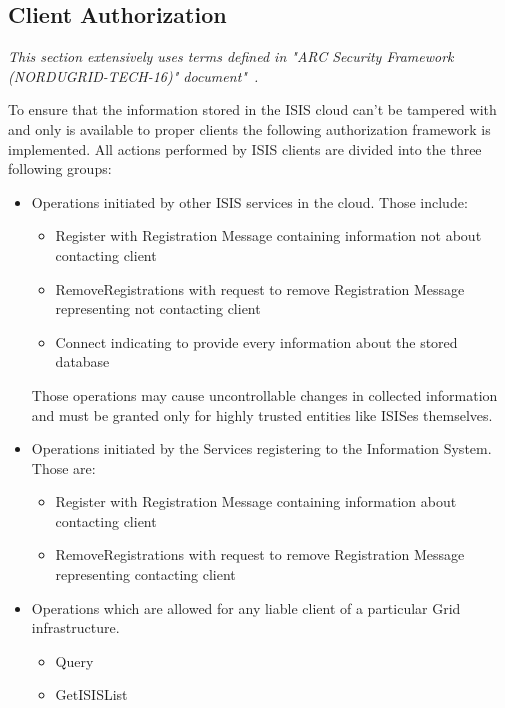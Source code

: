 \documentclass{book}
\begin{document}
\subsection{Client Authorization}
\label{sub:isis_authorization_client_authorization}


\textit{This section extensively uses terms defined in "ARC Security Framework (NORDUGRID-TECH-16)" document"~\cite{arc1-security}.}

To ensure that the information stored in the ISIS cloud can't be tampered with and only is available to proper clients the following authorization framework is implemented. All actions performed by ISIS clients are divided into the three following groups:

\begin{itemize}
 \item Operations initiated by other ISIS services in the cloud. Those include:
 \begin{itemize}
  \item Register with Registration Message containing information not about contacting client
  \item RemoveRegistrations with request to remove Registration Message representing not contacting client
  \item Connect indicating to provide every information about the stored database
 \end{itemize}

 Those operations may cause uncontrollable changes in collected information and must be granted only for highly trusted entities like ISISes themselves.

 \item Operations initiated by the Services registering to the Information System. Those are:
 \begin{itemize}
  \item Register with Registration Message containing information about contacting client
  \item RemoveRegistrations with request to remove Registration Message representing contacting client
 \end{itemize}

 \item Operations which are allowed for any liable client of a particular Grid infrastructure.
 \begin{itemize}
  \item Query
  \item GetISISList
 \end{itemize}
\end{itemize}
\end{document}
